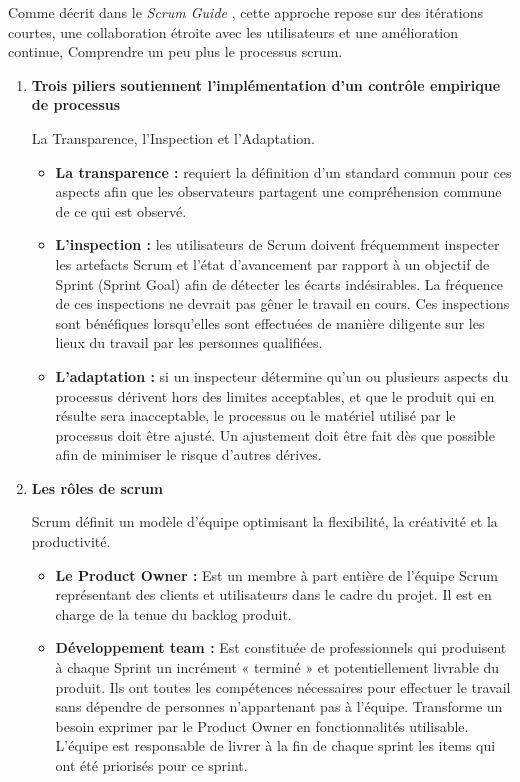 \documentclass[11pt,a4paper]{article}
\begin{document}
Comme décrit dans le \textit{Scrum Guide} \cite{scrumguide2020}, cette approche repose sur des itérations courtes, une collaboration étroite avec les utilisateurs et une amélioration continue, Comprendre un peu plus le processus scrum.

\begin{enumerate}
\item \textbf{Trois piliers soutiennent l’implémentation d’un contrôle empirique de processus}

La Transparence, l’Inspection et l’Adaptation.
	\begin{itemize}
	\item \textbf{La transparence :} requiert la définition d’un standard commun pour ces aspects afin que les observateurs partagent une compréhension commune de ce qui est observé.
	\item \textbf{L’inspection :} les utilisateurs de Scrum doivent fréquemment inspecter les artefacts Scrum et l’état d’avancement par rapport à un objectif de Sprint (Sprint Goal) afin de détecter les écarts indésirables. La fréquence de ces inspections ne devrait pas gêner le travail en cours. Ces inspections sont bénéfiques lorsqu’elles sont effectuées de manière diligente sur les lieux du travail par les personnes qualifiées.
	\item \textbf{L’adaptation :} si un inspecteur détermine qu’un ou plusieurs aspects du processus dérivent hors des limites acceptables, et que le produit qui en résulte sera inacceptable, le processus ou le matériel utilisé par le processus doit être ajusté. Un ajustement doit être fait dès que possible afin de minimiser le risque d’autres dérives.
	\end{itemize}
	
\item \textbf{Les rôles de scrum}

	Scrum définit un modèle d’équipe optimisant la flexibilité, la créativité et la productivité.
	\begin{itemize}
	\item \textbf{Le Product Owner :} Est un membre à part entière de l’équipe Scrum représentant des clients et utilisateurs dans le cadre du projet. Il est en charge de la tenue du backlog produit.
	\item \textbf{Développement team :} Est constituée de professionnels qui produisent à chaque Sprint un incrément « terminé » et potentiellement livrable du produit. Ils ont toutes les compétences nécessaires pour effectuer le travail sans dépendre de personnes n’appartenant pas à l’équipe. Transforme un besoin exprimer par le Product Owner en fonctionnalités utilisable. L’équipe est responsable de livrer à la fin de chaque sprint les items qui ont été priorisés pour ce sprint.
	

\end{itemize}
\end{enumerate}
\end{document}
